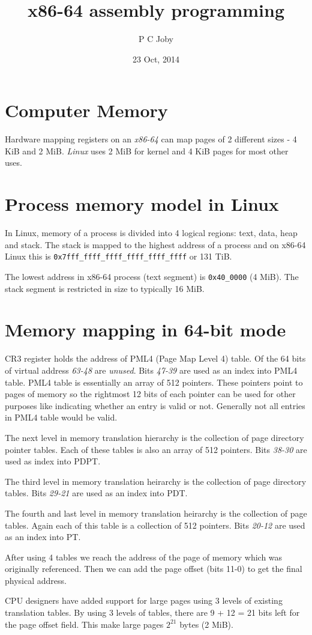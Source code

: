 \documentclass[a4paper, 12pt]{article}
\title{x86-64 assembly programming}
\author{P C Joby}
\date{23 Oct, 2014}
\begin{document}
\maketitle

\section{Computer Memory}

Hardware mapping registers on an \textit{x86-64} can map pages of 
2 different sizes - 4 KiB and 2 MiB. \textit{Linux} uses 2 MiB
for kernel and 4 KiB pages for most other uses.

\section{Process memory model in Linux}

In Linux, memory of a process is divided into 4 logical regions: text,
data, heap and stack. The stack is mapped to the highest address of a 
process and on x86-64 Linux this is \texttt{0x7fff\_ffff\_ffff\_ffff\_ffff\_ffff} or 131 TiB.

The lowest address in x86-64 process (text segment) is \texttt{0x40\_0000} (4 MiB).
The stack segment is restricted in size to typically 16 MiB.

\section{Memory mapping in 64-bit mode}

CR3 register holds the address of PML4 (Page Map Level 4) table.
Of the 64 bits of virtual address \textit{63-48} are \textit{unused}.
Bits \textit{47-39} are used as an index into PML4 table. PML4 table is 
essentially an array of 512 pointers. These pointers point to pages of memory
so the rightmost 12 bits of each pointer can be used for other purposes like
indicating whether an entry is valid or not. Generally not all entries in PML4 table would be valid.

The next level in memory translation hierarchy is the collection of page directory pointer tables. Each of these tables is also an array of 512 pointers.
Bits \textit{38-30} are used as index into PDPT.

The third level in memory translation heirarchy is the collection of page directory tables. Bits \textit{29-21} are used as an index into PDT.

The fourth and last level in memory translation heirarchy is the collection
of page tables. Again each of this table is a collection of 512 pointers. Bits \textit{20-12} are used as an index into PT. 

After using 4 tables we reach the address of the page of memory which was 
originally referenced. Then we can add the page offset (bits 11-0) to get the final physical address.

CPU designers have added support for large pages using 3 levels of existing
translation tables. By using 3 levels of tables, there are 9 + 12 = 21 bits left for the page offset field. This make large pages \(2^{21}\) bytes (2 MiB). 

 
\end{document}

